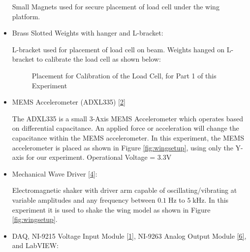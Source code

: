 \documentclass{article}
\begin{document}
\begin{itemize}
Small Magnets used for secure placement of load cell under the wing platform.
\vspace{2.5mm}

\item Brass Slotted Weights with hanger and L-bracket:
\vspace{1mm}

L-bracket used for placement of load cell on beam. Weights hanged on L-bracket to calibrate the load cell as shown below:

\begin{figure}[H]
    \centering
    \caption{Placement for Calibration of the Load Cell, for Part 1 of this Experiment}
    \label{fig:part1}
\end{figure}
\vspace{2.5mm}

\item MEMS Accelerometer (ADXL335) \hyperlink{datasheets}{[2]}
\vspace{1mm}

The ADXL335 is a small 3-Axis MEMS Accelerometer which operates based on differential capacitance. An applied force or acceleration will change the capacitance within the MEMS accelerometer. In this experiment, the MEMS accelerometer is placed as shown in Figure \ref{fig:wingsetup}, using only the Y-axis for our experiment. Operational Voltage = $3.3\text{V}$
\vspace{2.5mm}

\item Mechanical Wave Driver \hyperlink{datasheets}{[4]}: 
\vspace{1mm}

Electromagnetic shaker with driver arm capable of oscillating/vibrating at variable amplitudes and any frequency between $0.1\; \text{Hz}$ to $5\; \text{kHz}$. In this experiment it is used to shake the wing model as shown in Figure \ref{fig:wingsetup}. 
\vspace{2.5mm}

\item DAQ, NI-9215 Voltage Input Module \hyperlink{datasheets}{[1]}, NI-9263 Analog Output Module \hyperlink{datasheets}{[6]},  and LabVIEW:
\vspace{1mm}


\end{itemize}
\end{document}
